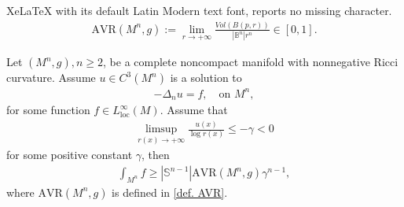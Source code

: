 \documentclass[10pt,a4paper]{amsart}
\begin{document}
XeLaTeX with its default Latin Modern text font, reports no missing character.
    \begin{align}\label{def. AVR}
        \mathrm{AVR}(M^n,g):=\lim_{r\to+\infty}
        \frac{Vol(B(p,r))}{|\mathbb{B}^n|r^n}
        \in[0,1].
    \end{align}

\begin{lemma}\label{lem. lower bound of L1 norm}
    Let $(M^n,g), n\geq 2$, be a complete noncompact manifold with nonnegative Ricci curvature. Assume $u\in C^3(M^n)$ is a solution to
    \begin{align*}
        -\Delta_n u=f,\quad
        \text{on }M^n,
    \end{align*}
    for some function $f\in L^{\infty}_{\text{loc}}(M)$.
    Assume that
    \begin{align}\label{limsup assumption}
        \limsup_{r(x)\to+\infty}
        \frac{u(x)}{\log r(x)}
        \leq -\gamma<0
    \end{align}
    for some positive constant $\gamma$, then
    \begin{align*}
        \int_{M^n}f
        \geq |\mathbb{S}^{n-1}|
        \mathrm{AVR}(M^n,g)\gamma^{n-1},
    \end{align*}
    where $\mathrm{AVR}(M^n,g)$ is defined in \cref{def. AVR}.
\end{lemma}
\end{document}
